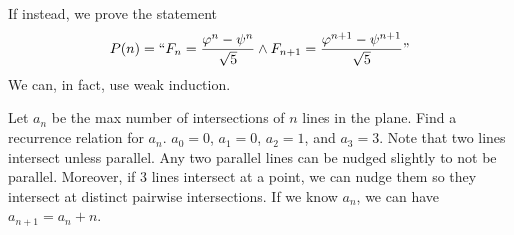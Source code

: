 \begin{remark}
    If instead, we prove the statement
    $$
    P(n) = ``F_n = \frac{\varphi^n - \psi^n}{\sqrt{5}} \land F_{n+1} = \frac{\varphi^{n+1}-\psi^{n+1}}{\sqrt{5}}"
    $$
    We can, in fact, use weak induction.
\end{remark}

Let $a_n$ be the max number of intersections of $n$ lines in the plane. Find a recurrence relation for $a_n$. $a_0 = 0$, $a_1 = 0$, $a_2 = 1$, and $a_3 = 3$. Note that two lines intersect unless parallel. Any two parallel lines can be nudged slightly to not be parallel. Moreover, if 3 lines intersect at a point, we can nudge them so they intersect at distinct pairwise intersections. If we know $a_n$, we can have $a_{n+1} = a_n + n$.

